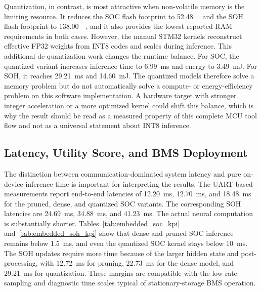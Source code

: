 \documentclass[
    a4paper,
    12pt,
    titlepage,
    bibliography=totoc,
    twoside=on,
    parskip=false,
    numbers=noenddot,
    cleardoublepage=empty,
    DIV=12,
    BCOR=12.0mm,
    headheight=36pt,
    headings=openright
]{scrreprt}
\begin{document}
Quantization, in contrast, is most attractive when non-volatile memory is the limiting resource. It reduces the SOC flash footprint to \SI{52.48}{\kilo\byte} and the SOH flash footprint to \SI{138.00}{\kilo\byte}, and it also provides the lowest reported RAM requirements in both cases. However, the manual STM32 kernels reconstruct effective FP32 weights from INT8 codes and scales during inference. This additional de-quantization work changes the runtime balance. For SOC, the quantized variant increases inference time to \SI{6.99}{\milli\second} and energy to \SI{3.49}{\milli\joule}. For SOH, it reaches \SI{29.21}{\milli\second} and \SI{14.60}{\milli\joule}. The quantized models therefore solve a memory problem but do not automatically solve a compute- or energy-efficiency problem on this software implementation. A hardware target with stronger integer acceleration or a more optimized kernel could shift this balance, which is why the result should be read as a measured property of this complete MCU tool flow and not as a universal statement about INT8 inference.

\subsection{Latency, Utility Score, and BMS Deployment}
The distinction between communication-dominated system latency and pure on-device inference time is important for interpreting the results. The UART-based measurements report end-to-end latencies of \SI{12.20}{\milli\second}, \SI{12.70}{\milli\second}, and \SI{18.48}{\milli\second} for the pruned, dense, and quantized SOC variants. The corresponding SOH latencies are \SI{24.69}{\milli\second}, \SI{34.88}{\milli\second}, and \SI{41.23}{\milli\second}. The actual neural computation is substantially shorter. Tables~\ref{tab:embedded_soc_kpi} and~\ref{tab:embedded_soh_kpi} show that dense and pruned SOC inference remains below \SI{1.5}{\milli\second}, and even the quantized SOC kernel stays below \SI{10}{\milli\second}. The SOH updates require more time because of the larger hidden state and post-processing, with \SI{12.72}{\milli\second} for pruning, \SI{22.73}{\milli\second} for the dense model, and \SI{29.21}{\milli\second} for quantization. These margins are compatible with the low-rate sampling and diagnostic time scales typical of stationary-storage BMS operation.\autocite{plettBatteryManagementSystems2015,berecibarCriticalReviewState2016}
\end{document}
